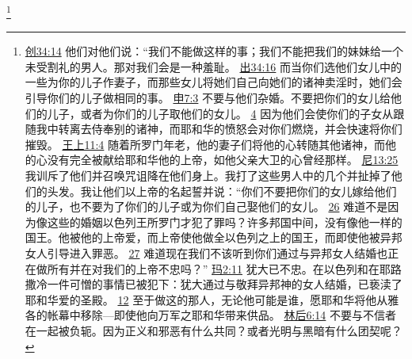 \documentclass[12pt, a4paper, oneside]{ctexart}
\begin{document}
	\footnote {
		\href{https://biblehub.com/genesis/34-14.htm}{创34:14} 他们对他们说：“我们不能做这样的事；我们不能把我们的妹妹给一个未受割礼的男人。那对我们会是一种羞耻。
		\href{https://biblehub.com/exodus/34-16.htm}{出34:16} 而当你们选他们女儿中的一些为你的儿子作妻子，而那些女儿将她们自己向她们的诸神卖淫时，她们会引导你们的儿子做相同的事。
		\href{https://biblehub.com/deuteronomy/7-3.htm}{申7:3} 不要与他们杂婚。不要把你们的女儿给他们的儿子，或者为你们的儿子取他们的女儿。
		\href{https://biblehub.com/deuteronomy/7-4.htm}{4} 因为他们会使你们的子女从跟随我中转离去侍奉别的诸神，而耶和华的愤怒会对你们燃烧，并会快速将你们摧毁。
		\href{https://biblehub.com/1_kings/11-4.htm}{王上11:4} 随着所罗门年老，他的妻子们将他的心转随其他诸神，而他的心没有完全被献给耶和华他的上帝，如他父亲大卫的心曾经那样。
		\href{https://biblehub.com/nehemiah/13-25.htm}{尼13:25} 我训斥了他们并召唤咒诅降在他们身上。我打了这些男人中的几个并扯掉了他们的头发。我让他们以上帝的名起誓并说：“你们不要把你们的女儿嫁给他们的儿子，也不要为了你们的儿子或为你们自己娶他们的女儿。
		\href{https://biblehub.com/nehemiah/13-26.htm}{26} 难道不是因为像这些的婚姻以色列王所罗门才犯了罪吗？许多邦国中间，没有像他一样的国王。他被他的上帝爱，而上帝使他做全以色列之上的国王，而即使他被异邦女人引导进入罪恶。
		\href{https://biblehub.com/nehemiah/13-27.htm}{27} 难道现在我们不该听到你们通过与异邦女人结婚也正在做所有并在对我们的上帝不忠吗？”
		\href{https://biblehub.com/malachi/2-11.htm}{玛2:11} 犹大已不忠。在以色列和在耶路撒冷一件可憎的事情已被犯下：犹大通过与敬拜异邦神的女人结婚，已亵渎了耶和华爱的圣殿。
		\href{https://biblehub.com/malachi/2-12.htm}{12} 至于做这的那人，无论他可能是谁，愿耶和华将他从雅各的帐幕中移除---即使他向万军之耶和华带来供品。
		\href{https://biblehub.com/2_corinthians/6-14.htm}{林后6:14} 不要与不信者在一起被负轭。因为正义和邪恶有什么共同？或者光明与黑暗有什么团契呢？
	}
\end{document}
